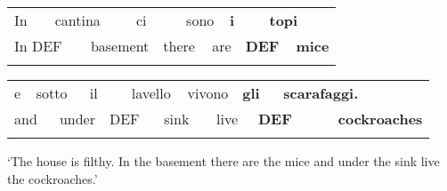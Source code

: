 \begin{tabular}{llllllllllll}
\lsptoprule
In & \multicolumn{2}{l}{cantina

} & \multicolumn{2}{l}{ci

} & \multicolumn{2}{l}{sono

} & \multicolumn{2}{l}{{\bfseries i}

} & \multicolumn{2}{l}{{\bfseries topi}

} & \\
\multicolumn{2}{l}{In DEF

} & \multicolumn{2}{l}{basement

} & \multicolumn{2}{l}{there

} & \multicolumn{2}{l}{are

} & \multicolumn{2}{l}{{\bfseries DEF}

} & \multicolumn{2}{l}{{\bfseries mice}

}\\
\lspbottomrule
\end{tabular}

\begin{tabular}{llllllllllllll}
\lsptoprule
e & \multicolumn{2}{l}{sotto

} & \multicolumn{2}{l}{il

} & \multicolumn{2}{l}{lavello

} & \multicolumn{2}{l}{vivono

} & \multicolumn{2}{l}{{\bfseries gli}

} & \multicolumn{2}{l}{{\bfseries scarafaggi.}

} & \\
\multicolumn{2}{l}{and

} & \multicolumn{2}{l}{under

} & \multicolumn{2}{l}{DEF

} & \multicolumn{2}{l}{sink

} & \multicolumn{2}{l}{live

} & \multicolumn{2}{l}{{\bfseries DEF}

} & \multicolumn{2}{l}{{\bfseries cockroaches}

}\\
\lspbottomrule
\end{tabular}

\begin{styleTranslation}
‘The house is filthy. In the basement there are the mice and under the sink live the cockroaches.’  

\end{styleTranslation}

